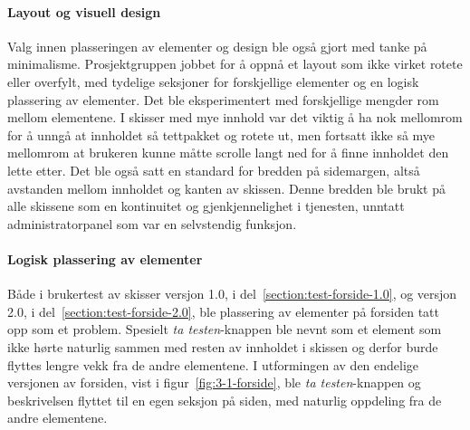 \paragraph{Layout og visuell design}
Valg innen plasseringen av elementer og design ble også gjort med tanke på minimalisme. Prosjektgruppen jobbet for å oppnå et layout som ikke virket rotete eller overfylt, med tydelige seksjoner for forskjellige elementer og en logisk plassering av elementer. Det ble eksperimentert med forskjellige mengder rom mellom elementene. I skisser med mye innhold var det viktig å ha nok mellomrom for å unngå at innholdet så tettpakket og rotete ut, men fortsatt ikke så mye mellomrom at brukeren kunne måtte scrolle langt ned for å finne innholdet den lette etter. Det ble også satt en standard for bredden på sidemargen, altså avstanden mellom innholdet og kanten av skissen. Denne bredden ble brukt på alle skissene som en kontinuitet og gjenkjennelighet i tjenesten, unntatt administratorpanel som var en selvstendig funksjon.

\paragraph{Logisk plassering av elementer}
Både i brukertest av skisser versjon 1.0, i del~\ref{section:test-forside-1.0}, og versjon 2.0, i del~\ref{section:test-forside-2.0}, ble plassering av elementer på forsiden tatt opp som et problem. Spesielt {\em ta testen}-knappen ble nevnt som et element som ikke hørte naturlig sammen med resten av innholdet i skissen og derfor burde flyttes lengre vekk fra de andre elementene. I utformingen av den endelige versjonen av forsiden, vist i figur~\ref{fig:3-1-forside}, ble {\em ta testen}-knappen og beskrivelsen flyttet til en egen seksjon på siden, med naturlig oppdeling fra de andre elementene.


